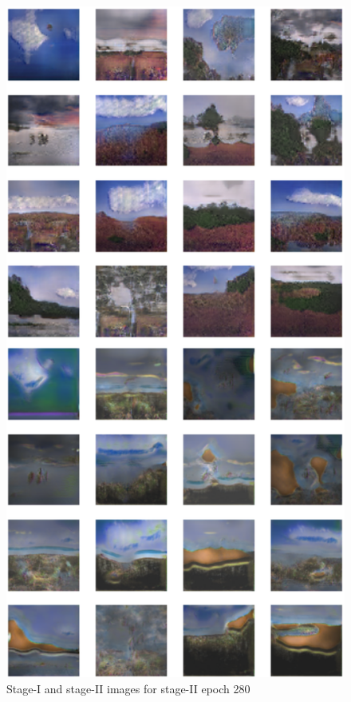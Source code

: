 \documentclass{article}
\begin{document}
	\begin{figure}[h]
	\centering
	\includegraphics[scale=0.6]{images/epoch280_FID445.png}
	\caption{Stage-I and stage-II images for stage-II epoch 280}
	\end{figure}
\end{document}
